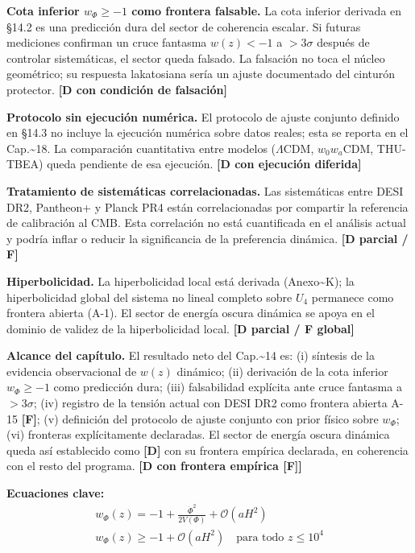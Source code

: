 ﻿\documentclass[11pt,letterpaper]{article}
\begin{document}
\textbf{Cota inferior $w_\Phi \geq -1$ como frontera falsable.} La cota inferior derivada en §14.2 es una predicción dura del sector de coherencia escalar. Si futuras mediciones confirman un cruce fantasma $w(z) < -1$ a $> 3\sigma$ después de controlar sistemáticas, el sector queda falsado. La falsación no toca el núcleo geométrico; su respuesta lakatosiana sería un ajuste documentado del cinturón protector. \textbf{[D con condición de falsación]}

\textbf{Protocolo sin ejecución numérica.} El protocolo de ajuste conjunto definido en §14.3 no incluye la ejecución numérica sobre datos reales; esta se reporta en el Cap.\textasciitilde{}18. La comparación cuantitativa entre modelos ($\Lambda$CDM, $w_0w_a$CDM, THU-TBEA) queda pendiente de esa ejecución. \textbf{[D con ejecución diferida]}

\textbf{Tratamiento de sistemáticas correlacionadas.} Las sistemáticas entre DESI DR2, Pantheon+ y Planck PR4 están correlacionadas por compartir la referencia de calibración al CMB. Esta correlación no está cuantificada en el análisis actual y podría inflar o reducir la significancia de la preferencia dinámica. \textbf{[D parcial / F]}

\textbf{Hiperbolicidad.} La hiperbolicidad local está derivada (Anexo\textasciitilde{}K); la hiperbolicidad global del sistema no lineal completo sobre $U_4$ permanece como frontera abierta (A-1). El sector de energía oscura dinámica se apoya en el dominio de validez de la hiperbolicidad local. \textbf{[D parcial / F global]}

\textbf{Alcance del capítulo.} El resultado neto del Cap.\textasciitilde{}14 es: (i) síntesis de la evidencia observacional de $w(z)$ dinámico; (ii) derivación de la cota inferior $w_\Phi \geq -1$ como predicción dura; (iii) falsabilidad explícita ante cruce fantasma a $> 3\sigma$; (iv) registro de la tensión actual con DESI DR2 como frontera abierta A-15 \textbf{[F]}; (v) definición del protocolo de ajuste conjunto con prior físico sobre $w_\Phi$; (vi) fronteras explícitamente declaradas. El sector de energía oscura dinámica queda así establecido como \textbf{[D]} con su frontera empírica declarada, en coherencia con el resto del programa. \textbf{[D con frontera empírica [F]]}

\textbf{Ecuaciones clave:}
\begin{align*}
    w_\Phi(z) = -1 + \frac{\dot\Phi^2}{2V(\Phi)} + \mathcal{O}(aH^2) \\
    w_\Phi(z) \geq -1 + \mathcal{O}(aH^2) \quad \text{para todo } z \leq 10^4
\end{align*}
\end{document}
